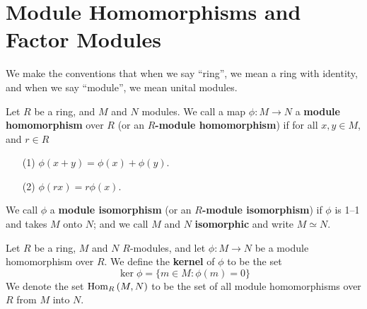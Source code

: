 \section{Module Homomorphisms and Factor Modules}

We make the conventions that when we say ``ring'', we mean a ring with identity,
and when we say ``module'', we mean unital modules.

\begin{definition}
    Let $R$ be a ring, and $M$ and  $N$ modules. We call a map $\phi:M
    \xrightarrow{} N$ a  \textbf{module homomorphism} over $R$ (or an
    \textbf{$R$-module homomorphism}) if for all $x,y \in M$, and  $r \in R$
    \begin{enumerate}
        \item[(1)] $\phi(x+y)=\phi(x)+\phi(y)$.

        \item[(2)] $\phi(rx)=r\phi(x)$.
    \end{enumerate}
    We call $\phi$ a \textbf{module isomorphism} (or an \textbf{$R$-module
    isomorphism}) if $\phi$ is 1--1 and takes $M$ onto $N$; and we call  $M$ and
     $N$  \textbf{isomorphic} and write $M \simeq N$.
\end{definition}

\begin{definition}
    Let $R$ be a ring,  $M$ and  $N$  $R$-modules, and let $\phi:M
    \xrightarrow{} N$ be a module homomorphism over $R$. We define the
    \textbf{kernel} of $\phi$ to be the set
    \begin{equation*}
        \ker{\phi}=\{m \in M : \phi(m)=0\}
    \end{equation*}
    We denote the set $\operatorname{Hom}_R{(M,N)}$ to be the set of all module homomorphisms
    over $R$ from $M$ into $N$.
\end{definition}

